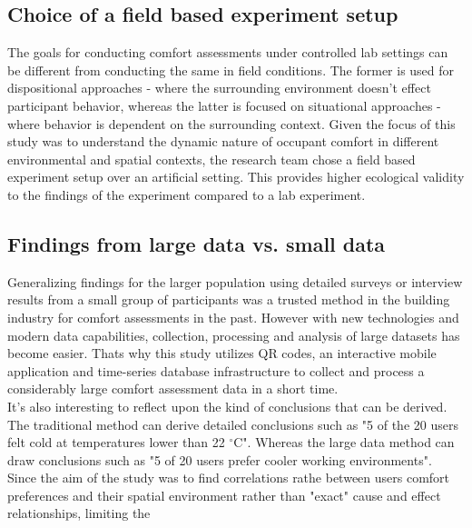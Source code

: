
\subsection{Choice of a field based experiment setup}

The goals for conducting comfort assessments under controlled lab settings can be different from conducting the same in field conditions. The former is used for dispositional approaches - where the surrounding environment doesn't effect participant behavior, whereas the latter is focused on situational approaches - where behavior is dependent on the surrounding context.
Given the focus of this study was to understand the dynamic nature of occupant comfort in different environmental and spatial contexts, the research team chose a field based experiment setup over an artificial setting. This provides higher ecological validity \cite{andrade2018internal}to the findings of the experiment compared to a lab experiment.           


\subsection{Findings from large data vs. small data}

Generalizing findings for the larger population using detailed surveys or interview results from a small group of participants was a trusted method in the building industry for comfort assessments in the past. However with new technologies and modern data capabilities, collection, processing and analysis of large datasets has become easier. Thats why this study utilizes QR codes, an interactive mobile application and time-series database infrastructure to collect and process a considerably large comfort assessment data in a short time.\\

It's also interesting to reflect upon the kind of conclusions that can be derived. The traditional method can derive detailed conclusions such as "5 of the 20 users felt cold at temperatures lower than 22 $^\circ$C". Whereas the large data method can draw conclusions such as "5 of 20 users prefer cooler working environments". Since the aim of the study was to find correlations rathe between users comfort preferences and their spatial environment rather than "exact" cause and effect relationships, limiting the 
  

